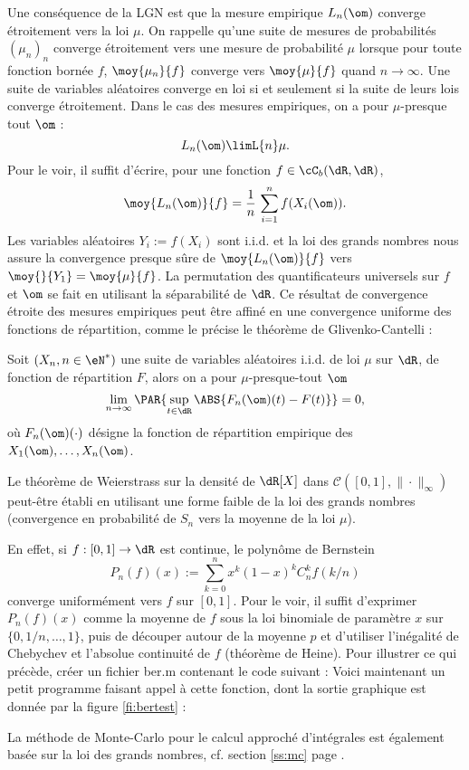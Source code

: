 Une conséquence de la LGN est que la mesure empirique $L_n(\om)$ converge
étroitement vers la loi $\mu$. On rappelle qu'une suite de mesures de
probabilités $(\mu_n)_n$ converge étroitement vers une mesure de probabilité
$\mu$ lorsque pour toute fonction bornée $f$, $\moy{\mu_n}{f}$ converge vers
$\moy{\mu}{f}$ quand $n\to\infty$.  Une suite de variables aléatoires converge
en loi si et seulement si la suite de leurs lois converge étroitement. Dans le
cas des mesures empiriques, on a pour $\mu$-presque tout $\om$ :
$$
L_n(\om)\limL{n}\mu.
$$
Pour le voir, il suffit d'écrire, pour une fonction $f\in\cC_b(\dR,\dR)$,
$$
\moy{L_n(\om)}{f}=\frac{1}{n}\,\sum_{i=1}^n f(X_i(\om)).
$$
Les variables aléatoires $Y_i:=f(X_i)$ sont i.i.d. et la loi des grands
nombres nous assure la convergence presque sûre de $\moy{L_n(\om)}{f}$ vers
$\moy{}{Y_1}=\moy{\mu}{f}$. La permutation des quantificateurs universels sur
$f$ et $\om$ se fait en utilisant la séparabilité de $\dR$. Ce résultat de
convergence étroite des mesures empiriques peut être affiné en une convergence
uniforme des fonctions de répartition, comme le précise le théorème de
Glivenko-Cantelli :

\begin{theorem}\label{th:gc}
  Soit $(X_n,n\in\eN^*)$ une suite de variables aléatoires i.i.d. de loi $\mu$
  sur $\dR$, de fonction de répartition $F$, alors on a pour
  $\mu$-presque-tout $\om$
 \begin{equation}\label{eq:gc} 
 \lim_{n\to\infty} \PAR{\sup_{t \in \dR} \ABS{F_n(\om)(t)-F(t)}} = 0, 
\end{equation}
où $F_n(\om)(\cdot)$ désigne la fonction de répartition empirique des
$X_1(\om),\ldots,X_n(\om)$.
\end{theorem}

\begin{exo}
  
  Le théorème de Weierstrass sur la densité de $\dR[X]$ dans
  $\mathcal{C}([0,1],\|\cdot\|_\infty)$ peut-être établi en utilisant une
  forme faible de la loi des grands nombres (convergence en probabilité de
  $S_n$ vers la moyenne de la loi $\mu$).
  
  En effet, si $f:[0,1]\to \dR$ est continue, le polynôme de Bernstein
  $$
  P_n(f)(x):=\sum_{k=0}^n x^k(1-x)^kC_n^k f(k/n)
  $$
  converge uniformément vers $f$ sur $[0,1]$. Pour le voir, il suffit
  d'exprimer $P_n(f)(x)$ comme la moyenne de $f$ sous la loi binomiale de
  paramètre $x$ sur $\{0,1/n,\ldots,1\}$, puis de découper autour de la
  moyenne $p$ et d'utiliser l'inégalité de Chebychev et l'absolue continuité
  de $f$ (théorème de Heine).  Pour illustrer ce qui précède, créer un fichier
  \textsf{ber.m} contenant le code suivant :
  Voici maintenant un petit programme faisant appel à cette fonction, dont la
  sortie graphique est donnée par la figure \ref{fi:bertest} :
\end{exo}
La méthode de Monte-Carlo pour le calcul approché d'intégrales est également
basée sur la loi des grands nombres, cf. section \ref{ss:mc} page
\pageref{ss:mc}.

